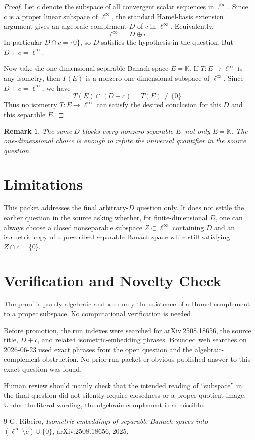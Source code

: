 \documentclass[11pt]{article}
\newtheorem{remark}{Remark}
\newcommand{\K}{\mathbb K}
\begin{document}
\begin{proof}
Let \(c\) denote the subspace of all convergent scalar sequences in
\(\ell^\infty\).  Since \(c\) is a proper linear subspace of \(\ell^\infty\),
the standard Hamel-basis extension argument gives an algebraic complement
\(D\) of \(c\) in \(\ell^\infty\).  Equivalently,
\[
        \ell^\infty = D \oplus c.
\]
In particular \(D\cap c=\{0\}\), so \(D\) satisfies the hypothesis in the
question.  But \(D+c=\ell^\infty\).

Now take the one-dimensional separable Banach space \(E=\K\).  If
\(T:E\to\ell^\infty\) is any isometry, then \(T(E)\) is a nonzero
one-dimensional subspace of \(\ell^\infty\).  Since \(D+c=\ell^\infty\), we
have
\[
        T(E)\cap(D+c) = T(E) \neq \{0\}.
\]
Thus no isometry \(T:E\to\ell^\infty\) can satisfy the desired conclusion for
this \(D\) and this separable \(E\).
\end{proof}

\begin{remark}
The same \(D\) blocks every nonzero separable \(E\), not only \(E=\K\).  The
one-dimensional choice is enough to refute the universal quantifier in the
source question.
\end{remark}

\section*{Limitations}

This packet addresses the final arbitrary-\(D\) question only.  It does not
settle the earlier question in the source asking whether, for
finite-dimensional \(D\), one can always choose a closed nonseparable subspace
\(Z\subset \ell^\infty\) containing \(D\) and an isometric copy of a prescribed
separable Banach space while still satisfying \(Z\cap c=\{0\}\).

\section*{Verification and Novelty Check}

The proof is purely algebraic and uses only the existence of a Hamel complement
to a proper subspace.  No computational verification is needed.

Before promotion, the run indexes were searched for arXiv:2508.18656, the
source title, \(D+c\), and related isometric-embedding phrases.  Bounded web
searches on 2026-06-23 used exact phrases from the open question and the
algebraic-complement obstruction.  No prior run packet or obvious published
answer to this exact question was found.

Human review should mainly check that the intended reading of ``subspace'' in
the final question did not silently require closedness or a proper quotient
image.  Under the literal wording, the algebraic complement is admissible.

\begin{thebibliography}{9}
G. Ribeiro,
\emph{Isometric embeddings of separable Banach spaces into
\((\ell^\infty\setminus c)\cup\{0\}\)},
arXiv:2508.18656, 2025.
\end{thebibliography}
\end{document}
